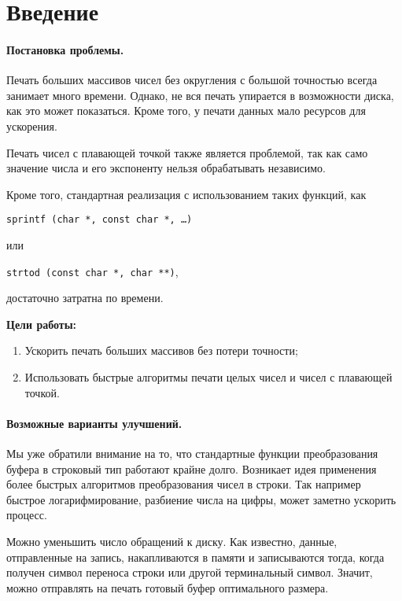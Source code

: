 \section*{Введение}
\paragraph{Постановка проблемы.}
Печать больших массивов чисел без округления с большой точностью всегда занимает много времени.
Однако, не вся печать упирается в возможности диска, как это может показаться.
Кроме того, у печати данных мало ресурсов для ускорения.

Печать чисел с плавающей точкой также является проблемой, так как само значение числа и его экспоненту нельзя обрабатывать независимо. 

Кроме того, стандартная реализация с использованием таких функций, как 
\begin{center}
\texttt{sprintf (char *, const char *, \dots)}
\end{center}
или \begin{center}
\texttt{strtod (const char *, char **)},
\end{center} достаточно затратна по времени.

\vspace{5pt}
\textbf{Цели работы:}
\begin{enumerate}
\item Ускорить печать больших массивов без потери точности;
\item Использовать быстрые алгоритмы печати целых чисел и чисел с плавающей точкой.
\end{enumerate}

\paragraph{Возможные варианты улучшений.}
Мы уже обратили внимание на то, что стандартные функции преобразования буфера в строковый тип  работают крайне долго. 
Возникает идея применения более быстрых алгоритмов преобразования чисел в строки. 
Так например быстрое логарифмирование, разбиение числа на цифры, может заметно ускорить процесс.

Можно уменьшить число обращений к диску.
Как известно, данные, отправленные на запись, накапливаются в памяти и записываются тогда, когда получен символ переноса строки или другой терминальный символ.
Значит, можно отправлять на печать готовый буфер оптимального размера.

